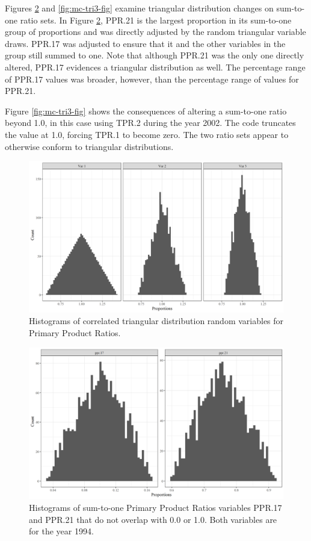 \documentclass[
]{book}
\begin{document}
Figures \ref{fig:mc-tri2-fig} and \ref{fig:mc-tri3-fig} examine triangular distribution changes on sum-to-one ratio sets. In Figure \ref{fig:mc-tri2-fig}, PPR.21 is the largest proportion in its sum-to-one group of proportions and was directly adjusted by the random triangular variable draws. PPR.17 was adjusted to ensure that it and the other variables in the group still summed to one. Note that although PPR.21 was the only one directly altered, PPR.17 evidences a triangular distribution as well. The percentage range of PPR.17 values was broader, however, than the percentage range of values for PPR.21.

Figure \ref{fig:mc-tri3-fig} shows the consequences of altering a sum-to-one ratio beyond 1.0, in this case using TPR.2 during the year 2002. The code truncates the value at 1.0, forcing TPR.1 to become zero. The two ratio sets appear to otherwise conform to triangular distributions.

\begin{figure}
\includegraphics[width=1\linewidth]{images/triang1} \caption{Histograms of correlated triangular distribution random variables for Primary Product Ratios.}\label{fig:mc-tri1-fig}
\end{figure}

\begin{figure}
\includegraphics[width=1\linewidth]{images/triang2} \caption{Histograms of sum-to-one Primary Product Ratios variables PPR.17 and PPR.21 that do not overlap with 0.0 or 1.0.  Both variables are for the year 1994.}\label{fig:mc-tri2-fig}
\end{figure}
\end{document}
